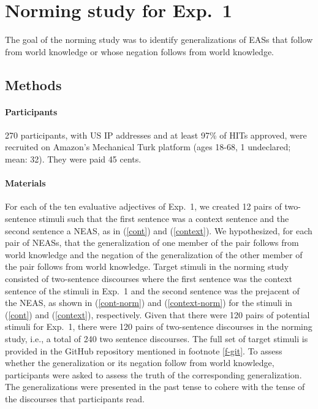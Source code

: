 \documentclass[11pt,fleqn]{article}
\newcommand{\6}{\mbox{$[\hspace*{-.6mm}[$}}
\newcommand{\9}{\mbox{$]\hspace*{-.6mm}]$}}
\begin{document}
\section{Norming study for Exp.~1}\label{a-norming}

The goal of the norming study was to identify generalizations of EASs that follow from world knowledge or whose negation follows from world knowledge. 

\subsection{Methods}

\paragraph{Participants} 270 participants, with US IP addresses and at least 97\% of HITs approved, were recruited on Amazon's Mechanical Turk platform (ages 18-68, 1 undeclared; mean: 32). They were paid 45 cents.


\paragraph{Materials} For each of the ten evaluative adjectives of Exp.~1, we created 12 pairs of two-sentence stimuli such that the first sentence was a context sentence and the second sentence a NEAS, as in (\ref{cont}) and (\ref{context}). We hypothesized, for each pair of NEASs, that the generalization of one member of the pair follows from world knowledge and the negation of the generalization of the other member of the pair follows from world knowledge. Target stimuli in the norming study consisted of two-sentence discourses where the first sentence was the context sentence of the stimuli in Exp.~1 and the second sentence was the prejacent of the NEAS, as shown in (\ref{cont-norm}) and (\ref{context-norm}) for the stimuli in (\ref{cont}) and (\ref{context}), respectively. Given that there were 120 pairs of potential stimuli for Exp.~1, there were 120 pairs of two-sentence discourses in the norming study, i.e., a total of 240 two sentence discourses. The full set of target stimuli is provided in the GitHub repository mentioned in footnote \ref{f-git}. To assess whether the generalization or its negation follow from world knowledge, participants were asked to assess the truth of the corresponding generalization. The generalizations were presented in the past tense to cohere with the tense of the discourses that participants read.
\end{document}
